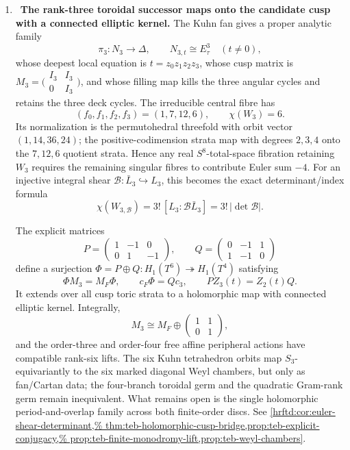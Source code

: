 \begin{enumerate}[leftmargin=1.8em,itemsep=.65em]
\item \Verified\ \textbf{The rank-three toroidal successor maps onto the
candidate cusp with a connected elliptic kernel.}
The Kuhn fan gives a proper analytic family
\[
 \pi_3:N_3\longrightarrow\Delta,\qquad
 N_{3,t}\cong E_\tau^3\quad(t\ne0),
\]
whose deepest local equation is \(t=z_0z_1z_2z_3\), whose cusp matrix is
\(M_3=\bigl(\begin{smallmatrix}I_3&I_3\\0&I_3\end{smallmatrix}\bigr)\),
and whose filling map kills the three angular cycles and retains the three
deck cycles.  The irreducible central fibre has
\[
 (f_0,f_1,f_2,f_3)=(1,7,12,6),\qquad \chi(W_3)=6.
\]
Its normalization is the permutohedral threefold with orbit vector
\((1,14,36,24)\); the positive-codimension strata map with degrees
\(2,3,4\) onto the \(7,12,6\) quotient strata.  Hence any real
\(S^8\)-total-space fibration retaining \(W_3\) requires the remaining
singular fibres to contribute Euler sum \(-4\).
For an injective integral shear
\(\mathcal B:\bar L_3\hookrightarrow L_3\), this becomes the exact
determinant/index formula
\[
 \chi(W_{3,\mathcal B})
 =3!\,[L_3:\mathcal B\bar L_3]
 =3!\,|\det\mathcal B|.
\]

The explicit matrices
\[
 P=\begin{pmatrix}1&-1&0\\0&1&-1\end{pmatrix},
 \qquad
 Q=\begin{pmatrix}0&-1&1\\1&-1&0\end{pmatrix}
\]
define a surjection
\(\Phi=P\oplus Q:H_1(T^6)\twoheadrightarrow H_1(T^4)\) satisfying
\[
 \Phi M_3=M_F\Phi,\qquad c_F\Phi=Qc_3,\qquad
 PZ_3(t)=Z_2(t)Q.
\]
It extends over all cusp toric strata to a holomorphic map with connected
elliptic kernel.  Integrally,
\[
 M_3\cong M_F\oplus
 \begin{pmatrix}1&1\\0&1\end{pmatrix},
\]
and the order-three and order-four free affine peripheral actions have
compatible rank-six lifts.  The six Kuhn tetrahedron orbits map
\(S_3\)-equivariantly to the six marked diagonal Weyl chambers, but only as
fan/Cartan data; the four-branch toroidal germ and the quadratic Gram-rank
germ remain inequivalent.  What remains open is the single holomorphic
period-and-overlap family across both finite-order discs.  See
\cref{hrftd:cor:euler-shear-determinant,%
thm:teb-holomorphic-cusp-bridge,prop:teb-explicit-conjugacy,%
 prop:teb-finite-monodromy-lift,prop:teb-weyl-chambers}.


\end{enumerate}
